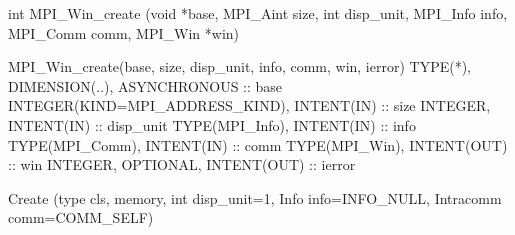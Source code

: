 int MPI_Win_create
   (void *base, MPI_Aint size, int disp_unit,
    MPI_Info info, MPI_Comm comm, MPI_Win *win)

MPI_Win_create(base, size, disp_unit, info, comm, win, ierror)
TYPE(*), DIMENSION(..), ASYNCHRONOUS :: base
INTEGER(KIND=MPI_ADDRESS_KIND), INTENT(IN) :: size
INTEGER, INTENT(IN) :: disp_unit
TYPE(MPI_Info), INTENT(IN) :: info
TYPE(MPI_Comm), INTENT(IN) :: comm
TYPE(MPI_Win), INTENT(OUT) :: win
INTEGER, OPTIONAL, INTENT(OUT) :: ierror

Create
   (type cls, memory, int disp_unit=1,
    Info info=INFO_NULL, Intracomm comm=COMM_SELF)
